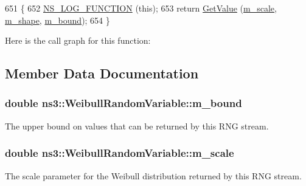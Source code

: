 \begin{DoxyCode}
651 \{
652   \hyperlink{log-macros-disabled_8h_a90b90d5bad1f39cb1b64923ea94c0761}{NS\_LOG\_FUNCTION} (\textcolor{keyword}{this});
653   \textcolor{keywordflow}{return} \hyperlink{classns3_1_1WeibullRandomVariable_a2575524b816f29677d0ad6e0a57a3833}{GetValue} (\hyperlink{classns3_1_1WeibullRandomVariable_a6129dc5c27fb0bce38643c21e3fbac1f}{m\_scale}, \hyperlink{classns3_1_1WeibullRandomVariable_a2bdace237fb231000449198efd0f9c01}{m\_shape}, \hyperlink{classns3_1_1WeibullRandomVariable_a5ddde1ec27e5c9c3091d5474af911cbb}{m\_bound});
654 \}
\end{DoxyCode}


Here is the call graph for this function\+:




\subsection{Member Data Documentation}
\subsubsection[{\texorpdfstring{m\+\_\+bound}{m_bound}}]{\setlength{\rightskip}{0pt plus 5cm}double ns3\+::\+Weibull\+Random\+Variable\+::m\+\_\+bound\hspace{0.3cm}{\ttfamily [private]}}\hypertarget{classns3_1_1WeibullRandomVariable_a5ddde1ec27e5c9c3091d5474af911cbb}{}\label{classns3_1_1WeibullRandomVariable_a5ddde1ec27e5c9c3091d5474af911cbb}
The upper bound on values that can be returned by this R\+NG stream. 
\subsubsection[{\texorpdfstring{m\+\_\+scale}{m_scale}}]{\setlength{\rightskip}{0pt plus 5cm}double ns3\+::\+Weibull\+Random\+Variable\+::m\+\_\+scale\hspace{0.3cm}{\ttfamily [private]}}\hypertarget{classns3_1_1WeibullRandomVariable_a6129dc5c27fb0bce38643c21e3fbac1f}{}\label{classns3_1_1WeibullRandomVariable_a6129dc5c27fb0bce38643c21e3fbac1f}
The scale parameter for the Weibull distribution returned by this R\+NG stream. 
